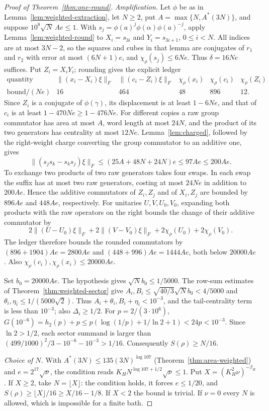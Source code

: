 \documentclass[11pt,a4paper]{article}
\theoremstyle{plain}
\theoremstyle{definition}
\theoremstyle{remark}
\begin{document}
\begin{proof}[Proof of Theorem~\ref{thm:one-round}]
\emph{Amplification.} Let $\phi$ be as in Lemma~\ref{lem:weighted-extraction}, let $N\ge2$, put $A=\max\{N,A^*(3N)\}$, and suppose
$10^8\sqrt N\,Ae\le1$. With $s_j=\phi(a)^j\phi(\alpha)\phi(a)^{-j}$, apply Lemma~\ref{lem:weighted-round} to $X_i=s_{3i}$ and $Y_i=s_{3i+1}$,
$0\le i<N$. All indices are at most $3N-2$, so the squares and cubes in that lemma are conjugates of $r_1$ and $r_2$ with error at most
$(6N+1)e$, and $\chi_\rho(s_j)\le6Ne$. Thus $\delta=16Ne$ suffices. Put $Z_i=X_iY_i$; rounding gives the explicit ledger
\[
\begin{array}{c|ccccc}
\text{quantity}&\|(x_i-X_i)\xi\|_F&\|(c_i-Z_i)\xi\|_F&\chi_\rho(x_i)&\chi_\rho(c_i)&\chi_\rho(Z_i)\\ \hline
\text{bound}/(Ne)&16&464&48&896&12.
\end{array}
\]
Since $Z_i$ is a conjugate of $\phi(\gamma)$, its displacement is at least $1-6Ne$, and that of $c_i$ is at least $1-470Ne\ge1-476Ne$.
For different copies a raw group commutator has area at most $A$, word length at most $24N$, and the product of its two generators has
centrality at most $12Ne$. Lemma~\ref{lem:charged}, followed by the right-weight charge converting the group commutator to an additive one, gives
\[
\|(s_js_k-s_ks_j)\xi\|_F\le(25A+48N+24N)e\le97Ae\le200Ae.
\]
To exchange two products of two raw generators takes four swaps. In each swap the suffix has at most two raw generators, costing at most
$24Ne$ in addition to $200Ae$. Hence the additive commutators of $Z_i,Z_j$ and of $X_i,Z_j$ are bounded by $896Ae$ and $448Ae$, respectively.
For unitaries $U,V,U_0,V_0$, expanding both products with the raw operators on the right bounds the change of their additive commutator by
\[
2\|(U-U_0)\xi\|_F+2\|(V-V_0)\xi\|_F+2\chi_\rho(U_0)+2\chi_\rho(V_0).
\]
The ledger therefore bounds the rounded commutators by $(896+1904)Ae=2800Ae$ and $(448+996)Ae=1444Ae$, both below $20000Ae$.
Also $\chi_\rho(c_i),\chi_\rho(x_i)\le20000Ae$.

Set $b_0=20000Ae$. The hypothesis gives $\sqrt N b_0\le1/5000$. The row-sum estimates of Theorem~\ref{thm:weighted-sector} give
$A_i,B_i\le\sqrt{40/3}\sqrt N b_0<4/5000$ and $\theta_i,\eta_i\le1/(5000\sqrt2)$.
Thus $A_i+\theta_i,B_i+\eta_i<10^{-3}$, and the tail-centrality term is less than $10^{-3}$; also $\Delta_i\ge1/2$.
For $p=2/(3\cdot10^6)$, $G(10^{-6})=h_2(p)+p\le p(\log(1/p)+1/\ln2+1)<24p<10^{-3}$.
Since $\ln2>1/2$, each sector summand is larger than
$(499/1000)^2/3-10^{-6}-10^{-3}>1/16$. Consequently $S(\rho)\ge N/16$.

\emph{Choice of $N$.} With $A^*(3N)\le135(3N)^{\log107}$ (Theorem~\ref{thm:area-weighted}) and $e=2^{17}\sqrt\nu$, the condition reads
$K_HN^{\log107+1/2}\sqrt\nu\le1$. Put $X=(K_H^2\nu)^{-\beta_H}$. If $X\ge2$, take $N=\lfloor X\rfloor$: the condition holds, it forces
$e\le1/20$, and $S(\rho)\ge\lfloor X\rfloor/16\ge X/16-1/8$. If $X<2$ the bound is trivial. If $\nu=0$ every $N$ is allowed, which is
impossible for a finite bath.
\end{proof}
\end{document}
